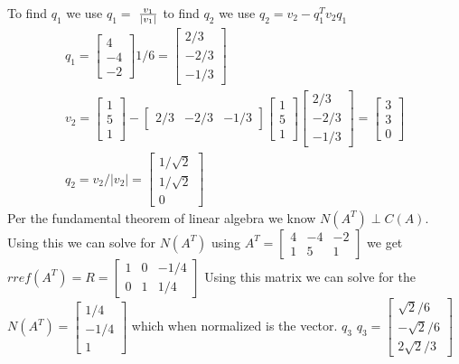 			To find $q_1$ we use $q_1=$ $v_1\over{|v_1|}$ to find $q_2$ we use $q_2=v_2-q_1^T v_2q_1$
			\begin{gather*}
			    q_1=\begin{bmatrix}4 \\ -4 \\ -2 \end{bmatrix}1/6 = \begin{bmatrix}2/3 \\ -2/3 \\ -1/3 \end{bmatrix} 
			    \\
			    v_2=\begin{bmatrix}1 \\ 5 \\ 1 \end{bmatrix}-\begin{bmatrix}2/3 & -2/3 & -1/3 \end{bmatrix} \begin{bmatrix}1 \\ 5 \\ 1 \end{bmatrix}\begin{bmatrix}2/3 \\ -2/3 \\ -1/3 \end{bmatrix}=\begin{bmatrix}3 \\ 3 \\ 0\end{bmatrix}
			    \\
			    q_2=v_2/|v_2|=\begin{bmatrix}1/\sqrt{2} \\ 1/\sqrt{2} \\ 0\end{bmatrix}
			\end{gather*}
			Per the fundamental theorem of linear algebra we know $N(A^T)\perp C(A)$. Using this we can solve for $N(A^T)$ using $A^T=\begin{bmatrix} 4 & -4 & -2 \\ 1 & 5 & 1\end{bmatrix}$ we get 
			$rref(A^T)=R=
			\begin{bmatrix} 
			1 & 0 & -1/4 \\ 
			0 & 1 & 1/4
			\end{bmatrix}$ 
			Using this matrix we can solve for the 
			$N(A^T)=
			\begin{bmatrix} 
			1/4 \\ -1/4 \\ 1 
			\end{bmatrix}$ 
			which when normalized is the vector. $q_3$ \newline
			$q_3 = \begin{bmatrix}\sqrt{2}/6 \\ -\sqrt{2}/6 \\ 2\sqrt{2}/3 \end{bmatrix}$
